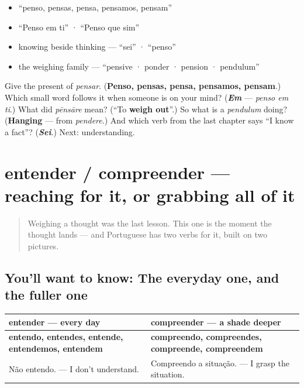 \begin{itemize}
\raggedright
  \item \textquotedblleft{}penso, pensas, pensa, pensamos, pensam\textquotedblright{}
  \item \textquotedblleft{}Penso em ti\textquotedblright{} · \textquotedblleft{}Penso que sim\textquotedblright{}
  \item knowing beside thinking — \textquotedblleft{}sei\textquotedblright{} · \textquotedblleft{}penso\textquotedblright{}
  \item the weighing family — \textquotedblleft{}pensive · ponder · pension · pendulum\textquotedblright{}
\end{itemize}

\begin{tcolorbox}[breakable,colback=teal!4,colframe=teal!35!black,title={Before you move on}]
Give the present of \emph{pensar}. (\textbf{Penso, pensas, pensa, pensamos, pensam}.) Which small word follows it when someone is on your mind? (\emph{\textbf{Em}} — \emph{penso em ti}.) What did \emph{pēnsāre} mean? (\textquotedblleft{}To \textbf{weigh out}\textquotedblright{}.) So what is a \emph{pendulum} doing? (\textbf{Hanging} — from \emph{pendere}.) And which verb from the last chapter says \textquotedblleft{}I know a fact\textquotedblright{}? (\emph{\textbf{Sei}}.) Next: understanding.
\end{tcolorbox}
\section[entender / compreender]{entender / compreender — reaching for it, or grabbing all of it}

\label{lesson:PT-C19-entender-compreender}



\begin{quote}
Weighing a thought was the last lesson. This one is the moment the thought lands — and Portuguese has two verbs for it, built on two pictures.
\end{quote}

\subsection*{You'll want to know: The everyday one, and the fuller one}
\noindent
\begin{tabularx}{\linewidth}{@{}>{\raggedright\arraybackslash}X>{\raggedright\arraybackslash}X@{}}
\toprule
\textbf{entender — every day} & \textbf{compreender — a shade deeper} \\
\midrule
\textbf{entendo, entendes, entende, entendemos, entendem} & \textbf{compreendo, compreendes, compreende, compreendem} \\
Não entendo. — I don't understand. & Compreendo a situação. — I grasp the situation. \\
\bottomrule
\end{tabularx}

